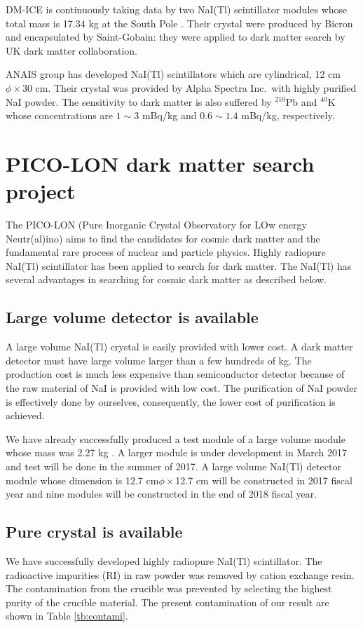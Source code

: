 \documentclass{jpsj-suppl} %
\begin{document}
DM-ICE is continuously taking data by two NaI(Tl) scintillator modules whose total mass is 
17.34 kg at the South Pole \cite{DM-ICE}.
Their crystal were produced by Bicron and encapsulated by Saint-Gobain: they were applied to 
dark matter search by UK dark matter collaboration\cite{UKDMC}.

ANAIS group has developed NaI(Tl) scintillators which are cylindrical, 12 cm$\phi\times30$ cm.
Their crystal was provided by Alpha Spectra Inc.\ with highly purified NaI powder.
The sensitivity to dark matter is also suffered by $^{210}$Pb and $^{40}$K whose 
concentrations are $1\sim3$ mBq/kg and $0.6\sim1.4$ mBq/kg, respectively.


\section{PICO-LON dark matter search project}
The PICO-LON (Pure Inorganic Crystal Observatory for LOw energy Neutr(al)ino) 
aims to find the candidates for cosmic dark matter and the fundamental rare process of 
nuclear and particle physics\cite{PICO-LON}.
Highly radiopure NaI(Tl) scintillator has been applied to search for dark matter.
The NaI(Tl) has several advantages in searching for cosmic dark matter as described below.

\subsection{Large volume detector is available} 
A large volume NaI(Tl) crystal is easily provided with lower cost. 
A dark matter detector must have large volume larger than a few hundreds of kg.
The production cost is much less expensive than semiconductor detector because of the 
raw material of NaI is provided with low cost.
The purification of NaI powder is effectively done by ourselves, consequently, the 
lower cost of purification is achieved.

We have already successfully produced a test module of a large volume module whose 
mass was 2.27 kg \cite{Takemoto}.
A larger module is under development in March 2017 and test will be done in the summer of 
2017.
A large volume NaI(Tl) detector module whose dimension is 12.7 cm$\phi\times$12.7 cm will be 
constructed in 2017 fiscal year and nine modules will be constructed in the end of 
2018 fiscal year. 

\subsection{Pure crystal is available} 
We have successfully developed highly radiopure NaI(Tl) scintillator\cite{ISRD, FushimiTAUP2015}.
The radioactive impurities (RI) in raw powder was removed by cation exchange resin.
The contamination from the crucible was prevented by selecting the highest purity of the 
crucible material.
The present contamination of our result are shown in Table \ref{tb:contami}.
\end{document}
